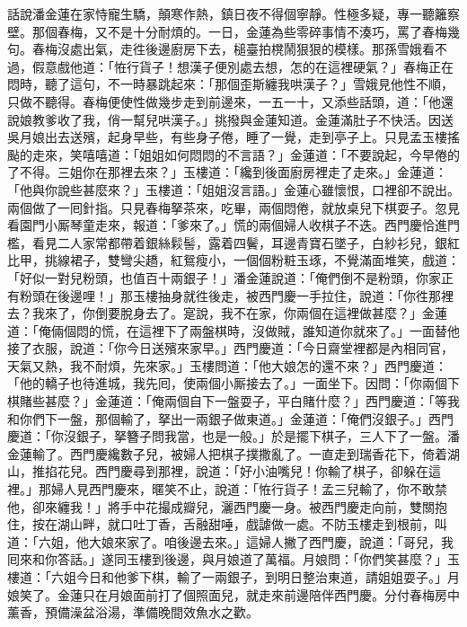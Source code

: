 話說潘金蓮在家恃寵生驕，顛寒作熱，鎮日夜不得個寧靜。性極多疑，專一聽籬察壁。那個春梅，又不是十分耐煩的。一日，金蓮為些零碎事情不湊巧，罵了春梅幾句。春梅沒處出氣，走徃後邊廚房下去，槌臺拍櫈鬧狠狠的模樣。那孫雪娥看不過，假意戲他道：「恠行貨子！想漢子便別處去想，怎的在這裡硬氣？」{}春梅正在悶時，聽了這句，不一時暴跳起來：「那個歪斯纏我哄漢子？」雪娥見他性不順，只做不聽得。春梅便使性做幾步走到前邊來，一五一十，又添些話頭，道：「他還說娘教爹收了我，俏一幫兒哄漢子。」挑撥與金蓮知道。金蓮滿肚子不快活。因送吳月娘出去送殯，起身早些，有些身子倦，睡了一覺，走到亭子上。只見孟玉樓搖颭的走來，{}笑嘻嘻道：「姐姐如何悶悶的不言語？」金蓮道：「不要說起，今早倦的了不得。三姐你在那裡去來？」玉樓道：「纔到後面廚房裡走了走來。」金蓮道：「他與你說些甚麼來？」玉樓道：「姐姐沒言語。」金蓮心雖懷恨，口裡卻不說出。兩個做了一囘針指。只見春梅拏茶來，吃畢，兩個悶倦，就放桌兒下棋耍子。忽見看園門小厮琴童走來，{}報道：「爹來了。」慌的兩個婦人收棋子不迭。西門慶恰進門檻，看見二人家常都帶着銀絲鬏髻，露着四鬢，耳邊青寶石墜子，白紗衫兒，銀紅比甲，挑線裙子，雙彎尖趫，紅鴛瘦小，一個個粉粧玉琢，不覺滿面堆笑，戲道：「好似一對兒粉頭，也值百十兩銀子！」潘金蓮說道：「俺們倒不是粉頭，你家正有粉頭在後邊哩！」{}那玉樓抽身就徃後走，被西門慶一手拉住，說道：「你徃那裡去？我來了，你倒要脫身去了。寔說，我不在家，你兩個在這裡做甚麼？」金蓮道：「俺倆個悶的慌，在這裡下了兩盤棋時，沒做賊，誰知道你就來了。」一面替他接了衣服，說道：「你今日送殯來家早。」西門慶道：「今日齋堂裡都是內相同官，天氣又熱，我不耐煩，先來家。」玉樓問道：「他大娘怎的還不來？」西門慶道：「他的轎子也待進城，我先囘，使兩個小厮接去了。」一面坐下。因問：「你兩個下棋賭些甚麼？」金蓮道：「俺兩個自下一盤耍子，平白賭什麼？」西門慶道：「等我和你們下一盤，那個輸了，拏出一兩銀子做東道。」金蓮道：「俺們沒銀子。」西門慶道：「你沒銀子，拏簪子問我當，也是一般。」於是擺下棋子，三人下了一盤。潘金蓮輸了。{}西門慶纔數子兒，被婦人把棋子撲撒亂了。一直走到瑞香花下，倚着湖山，推掐花兒。西門慶尋到那裡，說道：「好小油嘴兒！你輸了棋子，卻躲在這裡。」那婦人見西門慶來，暱笑不止，說道：「恠行貨子！孟三兒輸了，你不敢禁他，卻來纏我！」將手中花撮成瓣兒，灑西門慶一身。{}被西門慶走向前，雙關抱住，按在湖山畔，就口吐丁香，舌融甜唾，戲謔做一處。不防玉樓走到根前，叫道：「六姐，他大娘來家了。咱後邊去來。」這婦人撇了西門慶，說道：「哥兒，我囘來和你答話。」{}遂同玉樓到後邊，與月娘道了萬福。月娘問：「你們笑甚麼？」玉樓道：「六姐今日和他爹下棋，輸了一兩銀子，到明日整治東道，請姐姐耍子。」月娘笑了。金蓮只在月娘面前打了個照面兒，就走來前邊陪伴西門慶。分付春梅房中薰香，預備澡盆浴湯，準備晚間效魚水之歡。

